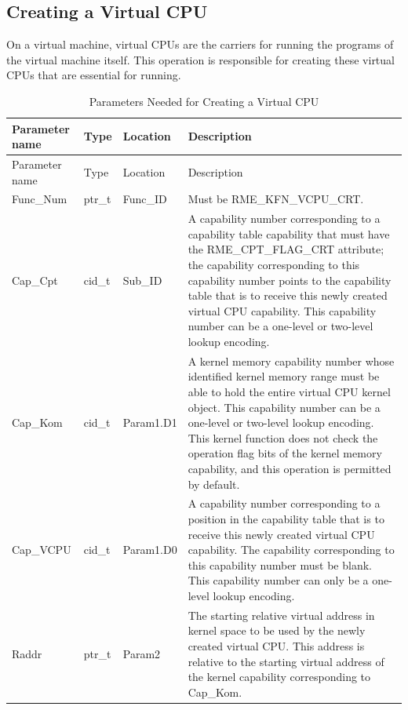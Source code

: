 \subsection{Creating a Virtual CPU}\label{subsec:8-create-virtual-cpu}

On a virtual machine, virtual CPUs are the carriers for running the programs of the virtual machine itself. This operation is responsible for creating these virtual CPUs that are essential for running.

\begin{xltabular}{\textwidth}{@{}>{\hsize\raggedright\arraybackslash}X>{\hsize\raggedright\arraybackslash}X>{\hsize\raggedright\arraybackslash}X>{\hsize\raggedright\arraybackslash}X@{}}
\caption{Parameters Needed for Creating a Virtual CPU}\label{tab:8-81-create-virtual-cpu-parameters}\\
\toprule
Parameter name & Type & Location & Description\tabularnewline
\endfirsthead
\toprule
Parameter name & Type & Location & Description\tabularnewline
\midrule
\endhead
\bottomrule
\endlastfoot
Func\_Num & ptr\_t & Func\_ID &
Must be RME\_KFN\_VCPU\_CRT.\tabularnewline
Cap\_Cpt & cid\_t & Sub\_ID &
A capability number corresponding to a capability table capability that must have the RME\_CPT\_FLAG\_CRT attribute; the capability corresponding to this capability number points to the capability table that is to receive this newly created virtual CPU capability. This capability number can be a one-level or two-level lookup encoding.\tabularnewline
Cap\_Kom & cid\_t & Param1.D1 &
A kernel memory capability number whose identified kernel memory range must be able to hold the entire virtual CPU kernel object. This capability number can be a one-level or two-level lookup encoding. This kernel function does not check the operation flag bits of the kernel memory capability, and this operation is permitted by default.\tabularnewline
Cap\_VCPU & cid\_t & Param1.D0 &
A capability number corresponding to a position in the capability table that is to receive this newly created virtual CPU capability. The capability corresponding to this capability number must be blank. This capability number can only be a one-level lookup encoding.\tabularnewline
Raddr & ptr\_t & Param2 &
The starting relative virtual address in kernel space to be used by the newly created virtual CPU. This address is relative to the starting virtual address of the kernel capability corresponding to Cap\_Kom.\tabularnewline
\end{xltabular}
\nopagebreak[4]

